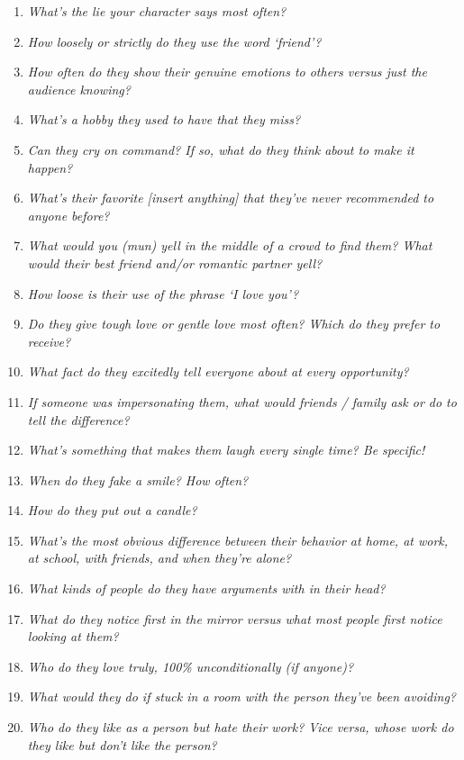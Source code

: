 \begin{enumerate}
    \item\textit{What’s the lie your character says most often?}
    \item\textit{How loosely or strictly do they use the word ‘friend’?}
    \item\textit{How often do they show their genuine emotions to others versus just the audience knowing?}
    \item\textit{What’s a hobby they used to have that they miss?}
    \item\textit{Can they cry on command? If so, what do they think about to make it happen?}
    \item\textit{What’s their favorite [insert anything] that they’ve never recommended to anyone before?}
    \item\textit{What would you (mun) yell in the middle of a crowd to find them? What would their best friend and/or romantic partner yell?}
    \item\textit{How loose is their use of the phrase ‘I love you’?}
    \item\textit{Do they give tough love or gentle love most often? Which do they prefer to receive?}
    \item\textit{What fact do they excitedly tell everyone about at every opportunity?}
    \item\textit{If someone was impersonating them, what would friends / family ask or do to tell the difference?}
    \item\textit{What’s something that makes them laugh every single time? Be specific!}
    \item\textit{When do they fake a smile? How often?}
    \item\textit{How do they put out a candle?}
    \item\textit{What’s the most obvious difference between their behavior at home, at work, at school, with friends, and when they’re alone?}
    \item\textit{What kinds of people do they have arguments with in their head?}
    \item\textit{What do they notice first in the mirror versus what most people first notice looking at them?}
    \item\textit{Who do they love truly, 100\% unconditionally (if anyone)?}
    \item\textit{What would they do if stuck in a room with the person they’ve been avoiding?}
    \item\textit{Who do they like as a person but hate their work? Vice versa, whose work do they like but don’t like the person?}

\end{enumerate}
